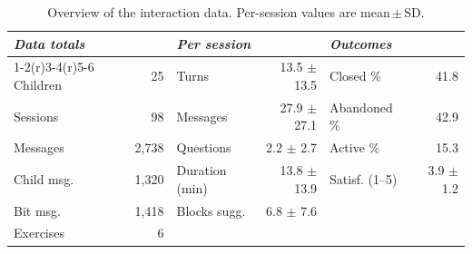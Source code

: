\begin{table}[ht]
\centering
\caption{Overview of the interaction data. Per-session values are mean\,$\pm$\,SD.}
\label{tab:corpus}
\footnotesize
\setlength{\tabcolsep}{4pt}
\begin{tabular}{lr@{\hskip 1.5em}lr@{\hskip 1.5em}lr}
\toprule
\multicolumn{2}{l}{\textit{Data totals}} &
\multicolumn{2}{l}{\textit{Per session}} &
\multicolumn{2}{l}{\textit{Outcomes}} \\
\cmidrule(r){1-2}\cmidrule(r){3-4}\cmidrule(r){5-6}
Children    & 25      & Turns          & 13.5 $\pm$ 13.5 & Closed \%      & 41.8 \\
Sessions    & 98      & Messages       & 27.9 $\pm$ 27.1 & Abandoned \%   & 42.9 \\
Messages    & 2{,}738 & Questions      & 2.2 $\pm$ 2.7   & Active \%      & 15.3 \\
Child msg.  & 1{,}320 & Duration (min) & 13.8 $\pm$ 13.9 & Satisf. (1--5) & 3.9 $\pm$ 1.2 \\
Bit msg.    & 1{,}418 & Blocks sugg.   & 6.8 $\pm$ 7.6   &                &    \\
Exercises   & 6       &                &                 &                &    \\
\bottomrule
\end{tabular}
\end{table}


%


